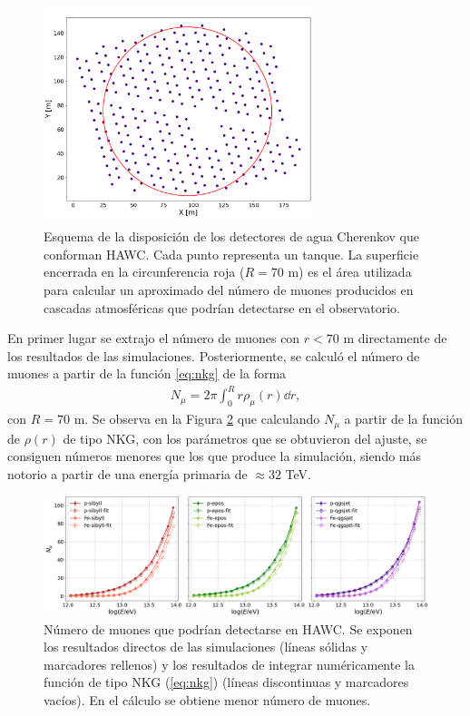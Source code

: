 \documentclass[12pt,letterpaper]{report}
\begin{document}
	\begin{figure}[h]
	\centering
	\includegraphics[width=0.7\textwidth]{Figuras/HAWC_array}
	\caption{Esquema de la disposici\'on de los detectores de agua Cherenkov que conforman HAWC. Cada punto representa un tanque. La superficie encerrada en la circunferencia roja ($R=70$ m) es el \'area utilizada para calcular un aproximado del n\'umero de muones producidos en cascadas atmosf\'ericas que podr\'ian detectarse en el observatorio.}
	\label{fig:hawc}
	\end{figure}

En primer lugar se extrajo el n\'umero de muones con $r<70$ m directamente de los resultados de las simulaciones. Posteriormente, se calcul\'o el n\'umero de muones a partir de la funci\'on \ref{eq:nkg} de la forma
	\begin{align} \label{eq:nkg_Nmu}
	N_{\mu} = 2 \pi \int_0^R r \rho_{\mu}(r) \dd{r},
	\end{align}
con $R=70$ m. Se observa en la Figura \ref{fig:munumbers} que calculando $N_{\mu}$ a partir de la funci\'on de $\rho(r)$ de tipo NKG, con los par\'ametros que se obtuvieron del ajuste, se consiguen n\'umeros menores que los que produce la simulaci\'on, siendo m\'as notorio a partir de una energ\'ia primaria de $\approx 32$ TeV.	\\
	\begin{figure} [h]
	\includegraphics[width=\textwidth]{Figuras/munumbers}
	\caption{N\'umero de muones que podr\'ian detectarse en HAWC. Se exponen los resultados directos de las simulaciones (l\'ineas s\'olidas y marcadores rellenos) y los resultados de integrar num\'ericamente la funci\'on de tipo NKG (\ref{eq:nkg}) (l\'ineas discontinuas y marcadores vac\'ios). En el c\'alculo se obtiene menor n\'umero de muones.}
	\label{fig:munumbers}
	\end{figure}
	
\end{document}
